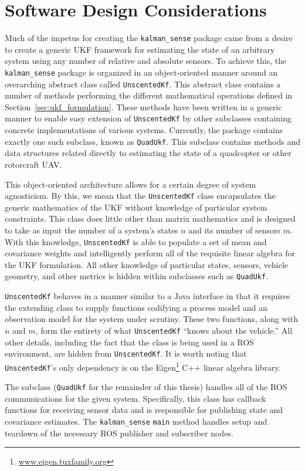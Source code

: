 \section{Software Design Considerations}

Much of the impetus for creating the \texttt{kalman\_sense} package came from a desire to create a generic UKF framework for estimating the state of an arbitrary system using any number of relative and absolute sensors. To achieve this, the \texttt{kalman\_sense} package is organized in an object-oriented manner around an overarching abstract class called \texttt{UnscentedKf}. This abstract class contains a number of methods performing the different mathematical operations defined in Section~\ref{sec:ukf_formulation}. These methods have been written in a generic manner to enable easy extension of \texttt{UnscentedKf} by other subclasses containing concrete implementations of various systems. Currently, the package contains exactly one such subclass, known as \texttt{QuadUkf}. This subclass contains methods and data structures related directly to estimating the state of a quadcopter or other rotorcraft UAV.

This object-oriented architecture allows for a certain degree of system agnosticism. By this, we mean that the \texttt{UnscentedKf} class encapsulates the generic mathematics of the UKF without knowledge of particular system constraints. This class does little other than matrix mathematics and is designed to take as input the number of a system's states $n$ and its number of sensors $m$. With this knowledge, \texttt{UnscentedKf} is able to populate a set of mean and covariance weights and intelligently perform all of the requisite linear algebra for the UKF formulation. All other knowledge of particular states, sensors, vehicle geometry, and other metrics is hidden within subclasses such as \texttt{QuadUkf}.

\texttt{UnscentedKf} behaves in a manner similar to a Java interface in that it requires the extending class to supply functions codifying a process model and an observation model for the system under scrutiny. These two functions, along with $n$ and $m$, form the entirety of what \texttt{UnscentedKf} ``knows about the vehicle.'' All other details, including the fact that the class is being used in a ROS environment, are hidden from \texttt{UnscentedKf}. It is worth noting that \texttt{UnscentedKf}'s only dependency is on the Eigen\footnote{\url{www.eigen.tuxfamily.org}} C++ linear algebra library.

The subclass (\texttt{QuadUkf} for the remainder of this thesis) handles all of the ROS communications for the given system. Specifically, this class has callback functions for receiving sensor data and is responsible for publishing state and covariance estimates. The \texttt{kalman\_sense} \texttt{main} method handles setup and teardown of the necessary ROS publisher and subscriber nodes.

